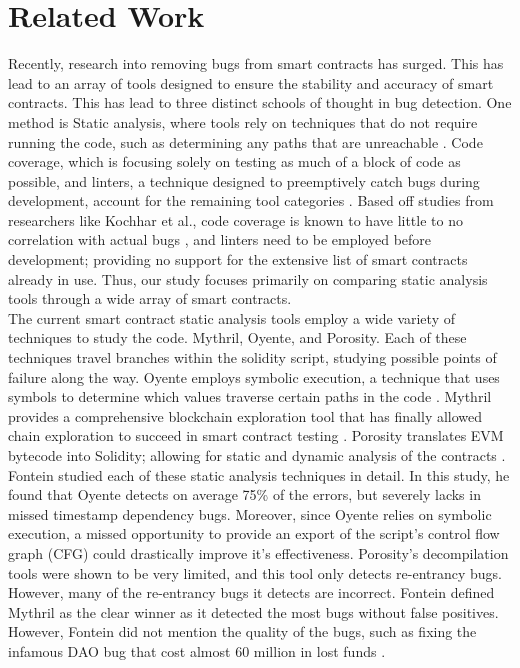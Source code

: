 \section{Related Work}

Recently, research into removing bugs from smart contracts has surged. This has lead to an array of tools designed to ensure the stability and accuracy of smart contracts. This has lead to three distinct schools of thought in bug detection. One method is Static analysis, where tools rely on techniques that do not require running the code, such as determining any paths that are unreachable \cite{everts2018will}. Code coverage, which is focusing solely on testing as much of a block of code as possible, and linters, a technique designed to preemptively catch bugs during development, account for the remaining tool categories \cite{manticore}. Based off studies from researchers like Kochhar et al., code coverage is known to have little to no correlation with actual bugs \cite{kochhar2017code, zhou2018security}, and linters need to be employed before development; providing no support for the extensive list of smart contracts already in use. Thus, our study focuses primarily on comparing static analysis tools through a wide array of smart contracts. \\

The current smart contract static analysis tools employ a wide variety of techniques to study the code. Mythril, Oyente, and Porosity. Each of these techniques travel branches within the solidity script, studying possible points of failure along the way. Oyente employs symbolic execution, a technique that uses symbols to determine which values traverse certain paths in the code \cite{king1976symbolic}. Mythril provides a comprehensive blockchain exploration tool that has finally allowed chain exploration to succeed in smart contract testing \cite{sen2005cute}. Porosity translates EVM bytecode into Solidity; allowing for static and dynamic analysis of the contracts \cite{porosity}. \\

Fontein studied each of these static analysis techniques in detail. In this study, he found that Oyente detects on average 75\% of the errors, but severely lacks in missed timestamp dependency bugs. Moreover, since Oyente relies on symbolic execution, a missed opportunity to provide an export of the script's control flow graph (CFG) could drastically improve it's effectiveness. Porosity's decompilation tools were shown to be very limited, and this tool only detects re-entrancy bugs. However, many of the re-entrancy bugs it detects are incorrect. Fontein defined Mythril as the clear winner as it detected the most bugs without false positives. However, Fontein did not mention the quality of the bugs, such as fixing the infamous DAO bug that cost almost 60 million in lost funds \cite{fontein2018comparison}. \\

